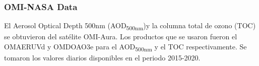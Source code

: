 \subsubsection{OMI-NASA Data}
El Aerosol Optical Depth 500nm (AOD\textsubscript{500nm})y la columna total de ozono (TOC) se obtuvieron del satélite OMI-Aura. Los productos que se usaron fueron el OMAERUVd \cite{OMI_AOD} y OMDOAO3e \cite{OMI_ozone} para el AOD\textsubscript{500nm} y el TOC respectivamente. Se tomaron los valores diarios disponibles en el periodo 2015-2020.